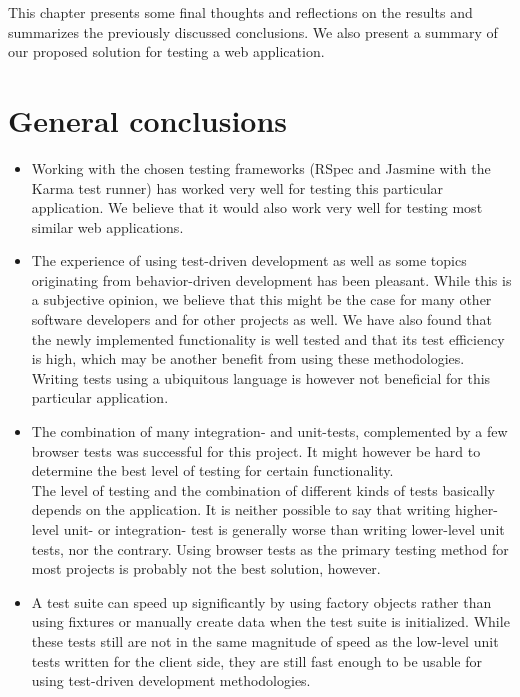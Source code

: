 
This chapter presents some final thoughts and reflections on the results
and summarizes the previously discussed conclusions. We also present a
summary of our proposed solution for testing a web application.\\

\section{General conclusions}

\begin{itemize}

\item  Working with the chosen testing frameworks (RSpec and Jasmine
with the Karma test runner) has worked very well for testing this
particular application. We believe that it would also work very well for
testing most similar web applications.\\

\item The experience of using test-driven development as well as some
topics originating from behavior-driven development has been pleasant.
While this is a subjective opinion, we believe that this might be the
case for many other software developers and for other projects as well.
We have also found that the newly implemented functionality is well
tested and that its test efficiency is high, which may be another
benefit from using these methodologies. Writing tests using a
ubiquitous language is however not beneficial for this particular
application.\\

\item The combination of many integration- and unit-tests, complemented
by a few browser tests was successful for this project. It might however
be hard to determine the best level of testing for certain
functionality.\\

The level of testing and the combination of different kinds of tests
basically depends on the application. It is neither possible to say that
writing higher-level unit- or integration- test is generally worse
than writing lower-level unit tests, nor the contrary. Using browser
tests as the primary testing method for most projects is probably not
the best solution, however.\\

\item A test suite can speed up significantly by using factory objects
rather than using fixtures or manually create data when the test suite
is initialized. While these tests still are not in the same magnitude of
speed as the low-level unit tests written for the client side, they are
still fast enough to be usable for using test-driven development
methodologies.\\


\end{itemize}
